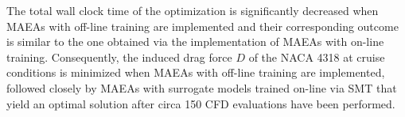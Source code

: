 
The total wall clock time of the optimization is significantly 
decreased when MAEAs with off-line training are implemented and 
their corresponding outcome is similar to the one obtained via the 
implementation of MAEAs with on-line training. Consequently, the 
induced drag force $D$ of the NACA 4318 at cruise conditions is 
minimized when MAEAs with off-line training are implemented, 
followed closely by MAEAs with surrogate models trained on-line 
via SMT that yield an optimal solution after circa 150 CFD 
evaluations have been performed.

\newpage